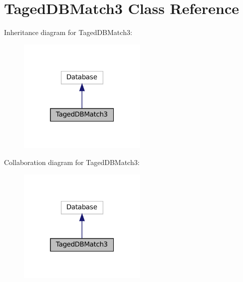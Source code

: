 \hypertarget{class_taged_d_b_match3}{}\section{Taged\+D\+B\+Match3 Class Reference}
\label{class_taged_d_b_match3}


Inheritance diagram for Taged\+D\+B\+Match3\+:\nopagebreak
\begin{figure}[H]
\begin{center}
\leavevmode
\includegraphics[width=175pt]{class_taged_d_b_match3__inherit__graph}
\end{center}
\end{figure}


Collaboration diagram for Taged\+D\+B\+Match3\+:\nopagebreak
\begin{figure}[H]
\begin{center}
\leavevmode
\includegraphics[width=175pt]{class_taged_d_b_match3__coll__graph}
\end{center}
\end{figure}
